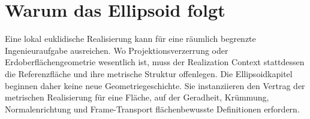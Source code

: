 \section{Warum das Ellipsoid folgt}

Eine lokal euklidische Realisierung kann für eine räumlich begrenzte
Ingenieuraufgabe ausreichen. Wo Projektionsverzerrung oder
Erdoberflächengeometrie wesentlich ist, muss der Realization Context
stattdessen die Referenzfläche und ihre metrische Struktur offenlegen. Die
Ellipsoidkapitel beginnen daher keine neue Geometriegeschichte. Sie
instanziieren den Vertrag der metrischen Realisierung für eine Fläche, auf der
Geradheit, Krümmung, Normalenrichtung und Frame-Transport
flächenbewusste Definitionen erfordern.
